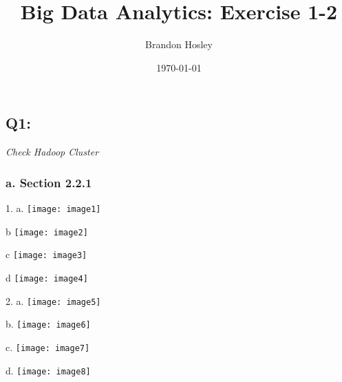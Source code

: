 \documentclass[]{article}
\title{Big Data Analytics: Exercise 1-2}
\author{Brandon Hosley}
\date{\today}
\begin{document}
\maketitle

\subsection*{Q1:}
\emph{Check Hadoop Cluster}

\subsubsection*{a. Section 2.2.1}

1.
a.
\texttt{[image: image1]} \vspace{-1.5em}

b
\texttt{[image: image2]} \vspace{-1.5em}

c
\texttt{[image: image3]} \vspace{-1.5em}

d
\texttt{[image: image4]} \vspace{-1.5em}

2.
a.
\texttt{[image: image5]} \vspace{-1.5em}

b.
\texttt{[image: image6]} \vspace{-1.5em}

c.
\texttt{[image: image7]} \vspace{-1.5em}

d.
\texttt{[image: image8]} \vspace{-1.5em}
\end{document}
